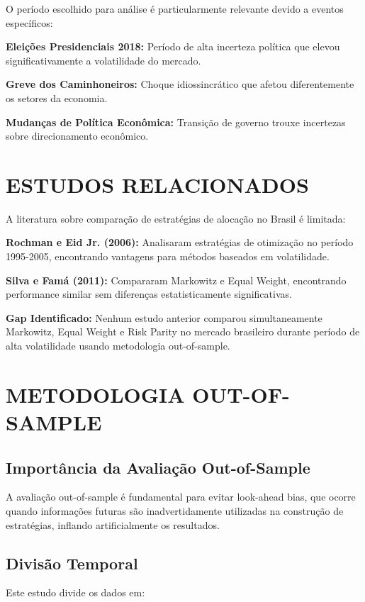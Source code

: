 O período escolhido para análise é particularmente relevante devido a eventos específicos:

\textbf{Eleições Presidenciais 2018:} Período de alta incerteza política que elevou significativamente a volatilidade do mercado.

\textbf{Greve dos Caminhoneiros:} Choque idiossincrático que afetou diferentemente os setores da economia.

\textbf{Mudanças de Política Econômica:} Transição de governo trouxe incertezas sobre direcionamento econômico.

\section{ESTUDOS RELACIONADOS}

A literatura sobre comparação de estratégias de alocação no Brasil é limitada:

\textbf{Rochman e Eid Jr. (2006):} Analisaram estratégias de otimização no período 1995-2005, encontrando vantagens para métodos baseados em volatilidade.

\textbf{Silva e Famá (2011):} Compararam Markowitz e Equal Weight, encontrando performance similar sem diferenças estatisticamente significativas.

\textbf{Gap Identificado:} Nenhum estudo anterior comparou simultaneamente Markowitz, Equal Weight e Risk Parity no mercado brasileiro durante período de alta volatilidade usando metodologia out-of-sample.

\section{METODOLOGIA OUT-OF-SAMPLE}

\subsection{Importância da Avaliação Out-of-Sample}

A avaliação out-of-sample é fundamental para evitar look-ahead bias, que ocorre quando informações futuras são inadvertidamente utilizadas na construção de estratégias, inflando artificialmente os resultados.

\subsection{Divisão Temporal}

Este estudo divide os dados em:

